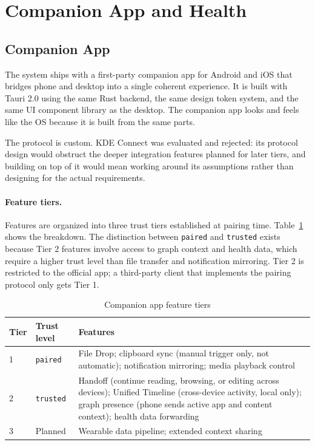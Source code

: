 \section{Companion App and Health}
\label{sec:companion-health}

\subsection{Companion App}
\label{sec:companion}

The system ships with a first-party companion app for Android and iOS that
bridges phone and desktop into a single coherent experience. It is built with
Tauri 2.0 using the same Rust backend, the same design token system, and the
same UI component library as the desktop. The companion app looks and feels
like the OS because it is built from the same parts.

The protocol is custom. KDE Connect was evaluated and rejected: its protocol
design would obstruct the deeper integration features planned for later tiers,
and building on top of it would mean working around its assumptions rather than
designing for the actual requirements.

\paragraph{Feature tiers.}
Features are organized into three trust tiers established at pairing time.
Table~\ref{tab:companion-tiers} shows the breakdown. The distinction between
\texttt{paired} and \texttt{trusted} exists because Tier 2 features involve
access to graph context and health data, which require a higher trust
level than file transfer and notification mirroring. Tier 2 is restricted
to the official app; a third-party client that implements the pairing protocol
only gets Tier 1.

\begin{table}[htbp]
\caption{Companion app feature tiers}
\label{tab:companion-tiers}
\begin{tabularx}{\linewidth}{llX}
\toprule
\textbf{Tier} & \textbf{Trust level} & \textbf{Features} \\
\midrule
1 & \texttt{paired}  &
  File Drop; clipboard sync (manual trigger only, not automatic);
  notification mirroring; media playback control \\
2 & \texttt{trusted} &
  Handoff (continue reading, browsing, or editing across devices);
  Unified Timeline (cross-device activity, local only);
  graph presence (phone sends active app and content context);
  health data forwarding \\
3 & Planned          &
  Wearable data pipeline; extended context sharing \\
\bottomrule
\end{tabularx}
\end{table}

